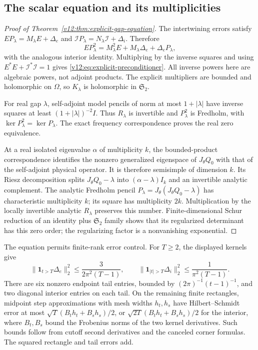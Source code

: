 \subsection{The scalar equation and its multiplicities}

\begin{proof}[Proof of Theorem~\ref{v12:thm:explicit-gap-equation}]
The intertwining errors satisfy
$EP_\lambda=M_\lambda E+\Delta_e$ and
$\mathcal IP_\lambda=N_\lambda\mathcal I+\Delta_i$.  Therefore
\[
 EP_\lambda^2=M_\lambda^2E+M_\lambda\Delta_e+\Delta_eP_\lambda,
\]
with the analogous interior identity.  Multiplying by the inverse
squares and using $E^*E+\mathcal I^*\mathcal I=1$ gives
\eqref{v12:eq:explicit-preconditioner}.  All inverse powers here are
algebraic powers, not adjoint products.  The explicit multipliers are
bounded and holomorphic on $\Omega$, so $K_\lambda$ is holomorphic in
$\mathfrak S_2$.

For real gap $\lambda$, self-adjoint model pencils of norm at most
$1+|\lambda|$ have inverse squares at least $(1+|\lambda|)^{-2}I$.
Thus $R_\lambda$ is invertible and $P_\lambda^2$ is Fredholm, with
$\ker P_\lambda^2=\ker P_\lambda$. The exact frequency correspondence
proves the real zero equivalence.

At a real isolated eigenvalue $\alpha$ of multiplicity $k$, the
bounded-product correspondence identifies the nonzero generalized
eigenspace of $J_\theta Q_0$ with that of the self-adjoint physical
operator.  It is therefore semisimple of dimension $k$.  Its Riesz
decomposition splits $J_\theta Q_0-\lambda$ into
$(\alpha-\lambda)I_k$ and an invertible analytic complement.  The
analytic Fredholm pencil $P_\lambda=J_\theta(J_\theta Q_0-\lambda)$
has characteristic multiplicity $k$; its square has multiplicity $2k$.
Multiplication by the locally invertible analytic $R_\lambda$ preserves
this number.  Finite-dimensional Schur reduction of an identity plus
$\mathfrak S_2$ family shows that its regularized determinant has this
zero order; the regularizing factor is a nonvanishing exponential.
\end{proof}

The equation permits finite-rank error control.  For $T\ge2$, the
displayed kernels give
\[
 \|\mathbf1_{t>T}\Delta_e\|_2^2\le\frac3{2\pi^2(T-1)},\qquad
 \|\mathbf1_{|t|>T}\Delta_i\|_2^2\le\frac1{\pi^2(T-1)}.
\]
There are six nonzero endpoint tail entries, bounded by
$(2\pi)^{-1}(t-1)^{-1}$, and two diagonal interior entries on each tail.
On the remaining finite rectangles, midpoint step approximations with
mesh widths $h_t,h_s$ have Hilbert--Schmidt error at most
$\sqrt T(B_th_t+B_sh_s)/2$, or
$\sqrt{2T}(B_th_t+B_sh_s)/2$ for the interior, where $B_t,B_s$ bound
the Frobenius norms of the two kernel derivatives.  Such bounds follow
from cutoff second derivatives and the canceled corner formulas.
The squared rectangle and tail errors add.

